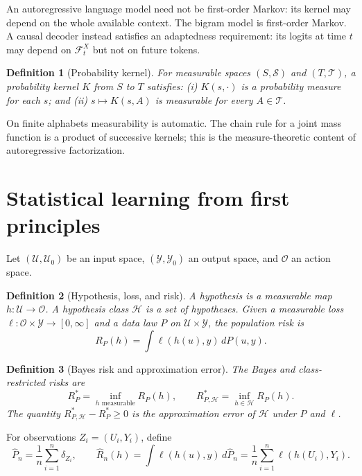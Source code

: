 \documentclass[11pt]{article}
\newtheorem{definition}{Definition}[section]
\newcommand{\1}{\mathbf 1}
\begin{document}
An autoregressive language model need not be first-order Markov: its kernel may
depend on the whole available context. The bigram model is first-order Markov.
A causal decoder instead satisfies an adaptedness requirement: its logits at
time $t$ may depend on $\mathcal F_t^X$ but not on future tokens.

\begin{definition}[Probability kernel]
For measurable spaces $(S,\mathcal S)$ and $(T,\mathcal T)$, a probability
kernel $K$ from $S$ to $T$ satisfies: (i) $K(s,\cdot)$ is a probability measure
for each $s$; and (ii) $s\mapsto K(s,A)$ is measurable for every
$A\in\mathcal T$.
\end{definition}

On finite alphabets measurability is automatic. The chain rule for a joint mass
function is a product of successive kernels; this is the measure-theoretic
content of autoregressive factorization.

\section{Statistical learning from first principles}
\label{sec:learning}

Let $(\mathcal U,\mathcal U_0)$ be an input space,
$(\mathcal Y,\mathcal Y_0)$ an output space, and $\mathcal O$ an action space.

\begin{definition}[Hypothesis, loss, and risk]
A hypothesis is a measurable map $h:\mathcal U\to\mathcal O$. A hypothesis
class $\mathcal H$ is a set of hypotheses. Given a measurable loss
$\ell:\mathcal O\times\mathcal Y\to[0,\infty]$ and a data law $P$ on
$\mathcal U\times\mathcal Y$, the population risk is
\[
 R_P(h)=\int\ell(h(u),y)\,dP(u,y).
\]
\end{definition}

\begin{definition}[Bayes risk and approximation error]
The Bayes and class-restricted risks are
\[
 R_P^*=\inf_{h\text{ measurable}}R_P(h),
 \qquad R_{P,\mathcal H}^*=\inf_{h\in\mathcal H}R_P(h).
\]
The quantity $R_{P,\mathcal H}^*-R_P^*\ge0$ is the approximation error of
$\mathcal H$ under $P$ and $\ell$.
\end{definition}

For observations $Z_i=(U_i,Y_i)$, define
\[
 \widehat P_n=\frac1n\sum_{i=1}^n\delta_{Z_i},
 \qquad
 \widehat R_n(h)=\int\ell(h(u),y)\,d\widehat P_n
 =\frac1n\sum_{i=1}^n\ell(h(U_i),Y_i).
\]
\end{document}
